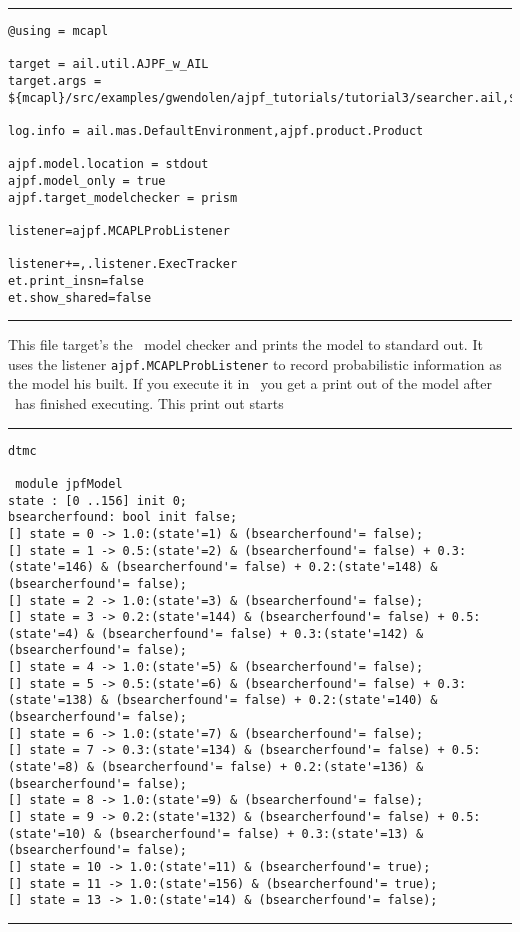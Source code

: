 \documentclass[a4]{article}
\begin{document}
\noindent\rule{\textwidth}{1pt}
\begin{small}
\begin{verbatim}
@using = mcapl

target = ail.util.AJPF_w_AIL
target.args = ${mcapl}/src/examples/gwendolen/ajpf_tutorials/tutorial3/searcher.ail,${mcapl}/src/examples/gwendolen/ajpf_tutorials/tutorial3/searcher.psl,1

log.info = ail.mas.DefaultEnvironment,ajpf.product.Product

ajpf.model.location = stdout
ajpf.model_only = true
ajpf.target_modelchecker = prism

listener=ajpf.MCAPLProbListener

listener+=,.listener.ExecTracker
et.print_insn=false
et.show_shared=false
\end{verbatim}
\end{small}
\noindent\rule{\textwidth}{1pt}

This file target's the \prism\ model checker and prints the model to standard out.  It uses the listener \texttt{ajpf.MCAPLProbListener} to record probabilistic information as the model his built.  If you execute it in \ajpf\ you get a print out of the model after \ajpf\  has finished executing.  This print out starts

\noindent\rule{\textwidth}{1pt}
\begin{small}
\begin{verbatim}
dtmc

 module jpfModel
state : [0 ..156] init 0;
bsearcherfound: bool init false;
[] state = 0 -> 1.0:(state'=1) & (bsearcherfound'= false);
[] state = 1 -> 0.5:(state'=2) & (bsearcherfound'= false) + 0.3:(state'=146) & (bsearcherfound'= false) + 0.2:(state'=148) & (bsearcherfound'= false);
[] state = 2 -> 1.0:(state'=3) & (bsearcherfound'= false);
[] state = 3 -> 0.2:(state'=144) & (bsearcherfound'= false) + 0.5:(state'=4) & (bsearcherfound'= false) + 0.3:(state'=142) & (bsearcherfound'= false);
[] state = 4 -> 1.0:(state'=5) & (bsearcherfound'= false);
[] state = 5 -> 0.5:(state'=6) & (bsearcherfound'= false) + 0.3:(state'=138) & (bsearcherfound'= false) + 0.2:(state'=140) & (bsearcherfound'= false);
[] state = 6 -> 1.0:(state'=7) & (bsearcherfound'= false);
[] state = 7 -> 0.3:(state'=134) & (bsearcherfound'= false) + 0.5:(state'=8) & (bsearcherfound'= false) + 0.2:(state'=136) & (bsearcherfound'= false);
[] state = 8 -> 1.0:(state'=9) & (bsearcherfound'= false);
[] state = 9 -> 0.2:(state'=132) & (bsearcherfound'= false) + 0.5:(state'=10) & (bsearcherfound'= false) + 0.3:(state'=13) & (bsearcherfound'= false);
[] state = 10 -> 1.0:(state'=11) & (bsearcherfound'= true);
[] state = 11 -> 1.0:(state'=156) & (bsearcherfound'= true);
[] state = 13 -> 1.0:(state'=14) & (bsearcherfound'= false);
\end{verbatim}
\end{small}
\noindent\rule{\textwidth}{1pt}
\end{document}
